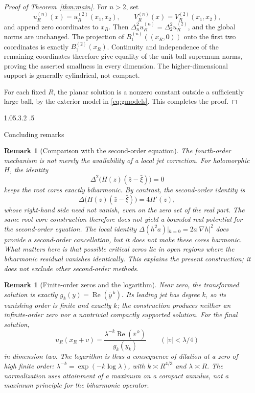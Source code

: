 \documentclass[11pt,a4paper,leqno]{amsart}
\makeatletter
\numberwithin{equation}{section}
\theoremstyle{landisplain}
\theoremstyle{landisdefinition}
\theoremstyle{landisremark}
\newtheorem{remark}[theorem]{Remark}
\newcommand{\Rea}{\operatorname{Re}}
\renewcommand\section{\Needspace{7\baselineskip}\@startsection{section}{1}{\z@}%
  {1.05\baselineskip \@plus .3\baselineskip \@minus .2\baselineskip}%
  {.5\baselineskip}%
  {\normalfont\large\bfseries\raggedright}}
\makeatother
\begin{document}
\begin{proof}[Proof of Theorem~\ref{thm:main}]
For $n>2$, set
\[
 u_R^{(n)}(x)=u_R^{(2)}(x_1,x_2),\qquad
 V_R^{(n)}(x)=V_R^{(2)}(x_1,x_2),
\]
and append zero coordinates to $x_R$. Then
$\Delta_n^2u_R^{(n)}=\Delta_2^2u_R^{(2)}$, and the global norms
are unchanged. The projection of $B_1^{(n)}((x_R,0))$ onto the first two
coordinates is exactly $B_1^{(2)}(x_R)$. Continuity and independence
of the remaining coordinates therefore give equality of the
unit-ball supremum norms, proving the asserted smallness in every
dimension. The higher-dimensional support is generally cylindrical,
not compact.

For each fixed $R$, the planar solution is a nonzero constant
outside a sufficiently large ball, by the exterior model in
\eqref{eq:gmodels}. This completes the proof.
\end{proof}


\section{Concluding remarks}
\label{sec:scope}

\begin{remark}[Comparison with the second-order equation]\label{rem:second-order}
The fourth-order mechanism is not merely the availability of a
local jet correction. For holomorphic $H$, the identity
\[
 \Delta^2\bigl(H(z)(\bar z-\bar\xi)\bigr)=0
\]
keeps the root cores exactly biharmonic. By contrast, the
second-order identity is
\[
 \Delta\bigl(H(z)(\bar z-\bar\xi)\bigr)=4H'(z),
\]
whose right-hand side need not vanish, even on the zero set of
the real part. The same root-core construction therefore does not
yield a bounded real potential for the second-order equation.
The local identity $\Delta(h^2a)|_{h=0}=2a|\nabla h|^2$
does provide a second-order cancellation, but it does not make
these cores harmonic. What matters here is that possible critical
zeros lie in open regions where the biharmonic residual vanishes
identically. This explains the present construction; it does not
exclude other second-order methods.
\end{remark}

\begin{remark}[Finite-order zeros and the logarithm]
Near zero, the transformed solution is exactly
$g_k(y)=\Rea(\bar y^{\,k})$. Its leading jet has degree $k$,
so its vanishing order is finite and exactly $k$; the construction
produces neither an infinite-order zero nor a nontrivial compactly
supported solution. For the final solution,
\[
 u_R(x_R+v)
 =\frac{\lambda^{-k}\Rea(\bar v^{\,k})}{g_k(y_k)}
 \qquad(|v|<\lambda/4)
\]
in dimension two. The logarithm is thus a consequence of dilation at a zero of
high finite order: $\lambda^{-k}=\exp(-k\log\lambda)$,
with $k\asymp R^{4/3}$ and $\lambda\asymp R$. The
normalization uses attainment of a maximum on a compact annulus,
not a maximum principle for the biharmonic operator.
\end{remark}
\end{document}
